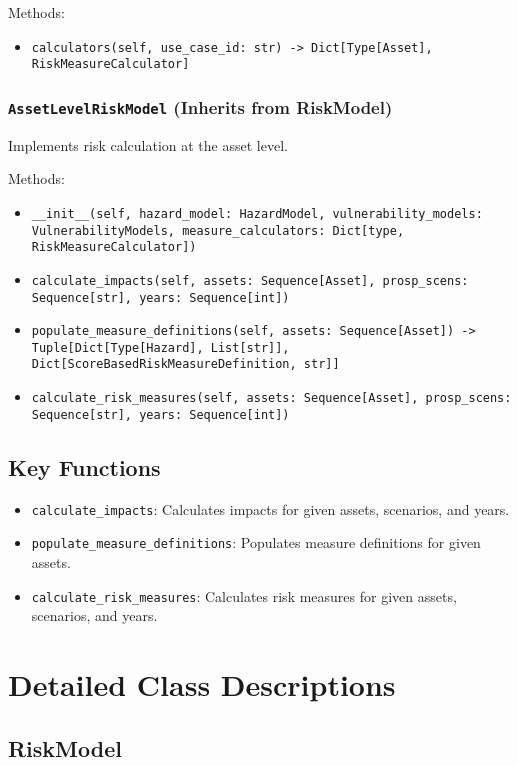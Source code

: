\documentclass{article}
\begin{document}
Methods:
\begin{itemize}
    \item \texttt{calculators(self, use\_case\_id: str) -> Dict[Type[Asset], RiskMeasureCalculator]}
\end{itemize}

\subsubsection{\texttt{AssetLevelRiskModel} (Inherits from RiskModel)}
Implements risk calculation at the asset level.

Methods:
\begin{itemize}
    \item \texttt{\_\_init\_\_(self, hazard\_model: HazardModel, vulnerability\_models: VulnerabilityModels, measure\_calculators: Dict[type, RiskMeasureCalculator])}
    \item \texttt{calculate\_impacts(self, assets: Sequence[Asset], prosp\_scens: Sequence[str], years: Sequence[int])}
    \item \texttt{populate\_measure\_definitions(self, assets: Sequence[Asset]) -> Tuple[Dict[Type[Hazard], List[str]], Dict[ScoreBasedRiskMeasureDefinition, str]]}
    \item \texttt{calculate\_risk\_measures(self, assets: Sequence[Asset], prosp\_scens: Sequence[str], years: Sequence[int])}
\end{itemize}

\subsection{Key Functions}

\begin{itemize}
    \item \texttt{calculate\_impacts}: Calculates impacts for given assets, scenarios, and years.
    \item \texttt{populate\_measure\_definitions}: Populates measure definitions for given assets.
    \item \texttt{calculate\_risk\_measures}: Calculates risk measures for given assets, scenarios, and years.
\end{itemize}

\section{Detailed Class Descriptions}

\subsection{RiskModel}
\end{document}
